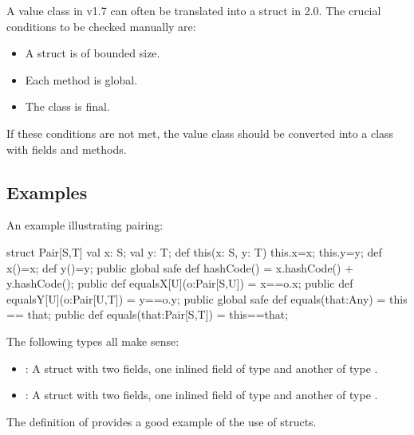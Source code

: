 A value class in \Xten{} v1.7 can often be translated into a struct in \Xten{} 2.0. The crucial conditions to be checked manually are: \begin{itemize}
\item  A struct is of bounded size. 
\item  Each method is global. 
\item  The class is final.
\end{itemize}
 

If these conditions are not met, the value class should be converted
into a class with  fields and methods.

\subsection{Examples}

An example illustrating pairing:

%
\begin{xten}
struct Pair[S,T]  {
  val x: S;
  val y: T;
  def this(x: S, y: T) {
    this.x=x;
    this.y=y;
  }
  def x()=x;
  def y()=y;  
  public global safe def hashCode() = x.hashCode() + y.hashCode();
  public def equalsX[U](o:Pair[S,U]) = x==o.x;
  public def equalsY[U](o:Pair[U,T]) = y==o.y;
  public global safe def equals(that:Any) = this == that;
  public def equals(that:Pair[S,T]) = this==that;
}
\end{xten}
% 

The following types all make sense: 
\begin{itemize}
\item {}: A struct with two fields, one inlined field of type  and another of type . 
\item {}: A struct with two fields, one inlined field of type  and another of type . 
\end{itemize}

The definition of  provides a good example of the use of structs.

